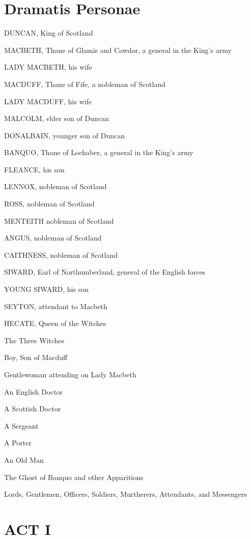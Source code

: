 \documentclass{book}
\newcommand{\Act}[1]{\chapter{#1}}
\newcommand{\ShowHeaderLine}{\renewcommand\headrulewidth{0.4pt}}
\newcommand{\NewPage}{\vfill\pagebreak}%
\newcommand{\Columns}{\twocolumn}
\begin{document}
\ShowHeaderLine
\NewPage{}

\chapter{Dramatis Personae}

DUNCAN, King of Scotland

MACBETH, Thane of Glamis and Cawdor, a general in the King's army

LADY MACBETH, his wife

MACDUFF, Thane of Fife, a nobleman of Scotland

LADY MACDUFF, his wife

MALCOLM, elder son of Duncan

DONALBAIN, younger son of Duncan

BANQUO, Thane of Lochaber, a general in the King's army

FLEANCE, his son

LENNOX, nobleman of Scotland

ROSS, nobleman of Scotland

MENTEITH nobleman of Scotland

ANGUS, nobleman of Scotland

CAITHNESS, nobleman of Scotland

SIWARD, Earl of Northumberland, general of the English forces

YOUNG SIWARD, his son

SEYTON, attendant to Macbeth

HECATE, Queen of the Witches

The Three Witches

Boy, Son of Macduff

Gentlewoman attending on Lady Macbeth

An English Doctor

A Scottish Doctor

A Sergeant

A Porter

An Old Man

The Ghost of Banquo and other Apparitions

Lords, Gentlemen, Officers, Soldiers, Murtherers, Attendants, and Messengers


\Columns



\pagestyle{fancy}
\fancyhead{}
\fancyhead[L]{\leftmark}
\fancyhead[R]{\rightmark}

\Act{ACT I}
\end{document}
